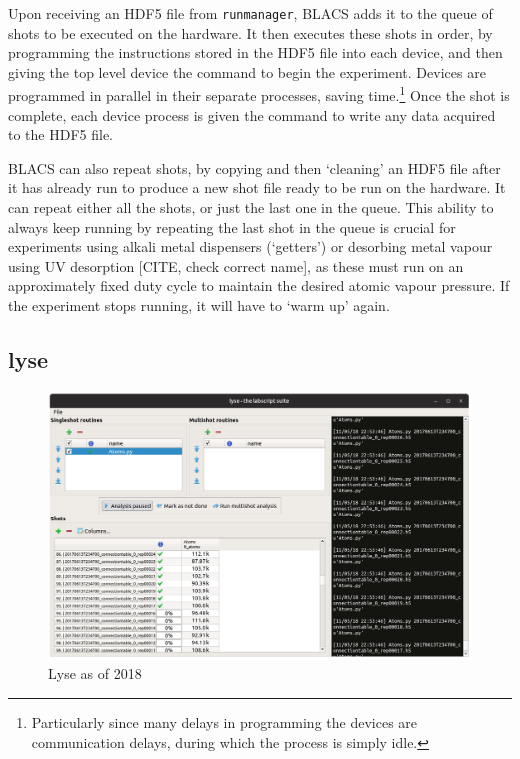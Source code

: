 Upon receiving an HDF5 file from \texttt{runmanager}, BLACS adds it to the queue of shots to be executed on the hardware. It then executes these shots in order, by programming the instructions stored in the HDF5 file into each device, and then giving the top level device the command to begin the experiment. Devices are programmed in parallel in their separate processes, saving time.\footnote{Particularly since many delays in programming the devices are communication delays, during which the process is simply idle.} Once the shot is complete, each device process is given the command to write any data acquired to the HDF5 file.

BLACS can also repeat shots, by copying and then `cleaning' an HDF5 file after it has already run to produce a new shot file ready to be run on the hardware. It can repeat either all the shots, or just the last one in the queue. This ability to always keep running by repeating the last shot in the queue is crucial for experiments using alkali metal dispensers (`getters') or desorbing metal vapour using UV desorption [CITE, check correct name], as these must run on an approximately fixed duty cycle to maintain the desired atomic vapour pressure. If the experiment stops running, it will have to `warm up' again.

\subsection{lyse}
\begin{figure}
\begin{center}
\includegraphics[width=\textwidth]{figures/software/new_screenshots/lyse.png}
\caption{Lyse as of 2018}\label{fig:lyse}
\end{center}
\end{figure}

